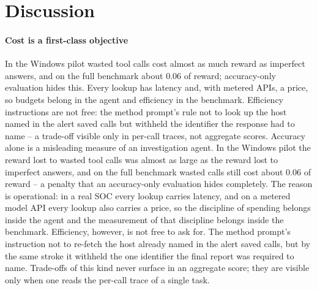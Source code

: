 \section{Discussion}
\label{sec:discussion}

\paragraph{Cost is a first-class objective} \ifconf
In the Windows pilot wasted tool calls cost almost as much reward as
imperfect answers, and on the full benchmark about 0.06 of reward; accuracy-only evaluation hides this. Every
lookup has latency and, with metered APIs, a price, so budgets belong in the agent and efficiency in the
benchmark. Efficiency instructions are not free: the method prompt's rule not to look up the host named in the
alert saved calls but withheld the identifier the response had to name -- a trade-off visible only in per-call
traces, not aggregate scores.
\else
Accuracy alone is a misleading measure of an investigation agent. In the Windows pilot the reward lost to wasted
tool calls was almost as large as the reward lost to imperfect answers, and on the full benchmark wasted calls
still cost about $0.06$ of reward -- a penalty that an accuracy-only evaluation hides completely. The reason is
operational: in a real SOC every lookup carries latency, and on a metered model API every lookup also carries a
price, so the discipline of spending belongs inside the agent and the measurement of that discipline belongs
inside the benchmark. Efficiency, however, is not free to ask for. The method prompt's instruction not to re-fetch
the host already named in the alert saved calls, but by the same stroke it withheld the one identifier the final
report was required to name. Trade-offs of this kind never surface in an aggregate score; they are visible only
when one reads the per-call trace of a single task.
\fi

